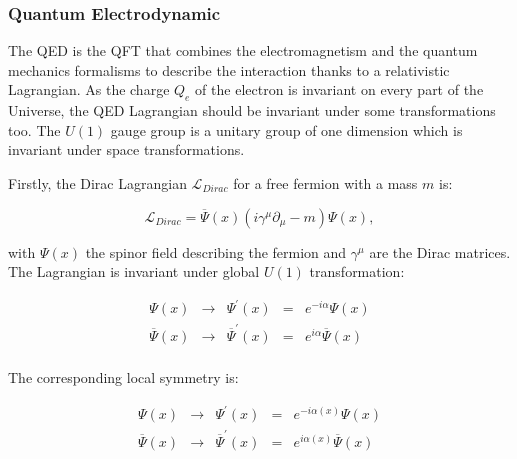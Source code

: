     
      \subsubsection{Quantum Electrodynamic}

     The \gls{QED} is the \gls{QFT} that combines the electromagnetism and the quantum mechanics formalisms to describe the interaction thanks to a relativistic Lagrangian.
     As the charge $Q_e$ of the electron is invariant on every part of the Universe, the \gls{QED} Lagrangian should be invariant under some transformations too.
     The $U(1)$ gauge group is a unitary group of one dimension which is invariant under space transformations.

      Firstly, the Dirac Lagrangian $\mathcal{L}_{Dirac}$ for a free fermion with a mass $m$ is:
      
      \begin{equation}
        \mathcal{L}_{Dirac} = \overline{\Psi}\left(x\right) \left(i \gamma^{\mu}\partial_{\mu} - m \right) \Psi\left(x\right),
        \label{eq:diracLag}
      \end{equation}

      with $\Psi\left(x\right)$ the spinor field describing the fermion and $\gamma^{\mu}$ are the Dirac matrices. 
      The Lagrangian is invariant under global $U(1)$ transformation:

      \begin{equation}
            \begin{array}{rrccr}
             \Psi \left(x \right) & \rightarrow & \Psi^{'} \left(x \right)  & = & e^{-i\alpha} \Psi\left(x\right) \\
             \overline{\Psi}\left(x\right) & \rightarrow & \overline{\Psi}^{'}\left(x\right) & = & e^{i\alpha}  \overline{\Psi}\left(x\right) \\
            \end{array}
      \end{equation}

      The corresponding local symmetry is:

      \begin{equation}
            \begin{array}{rcccr}
             \Psi\left(x\right) & \rightarrow & \Psi^{'} \left(x \right) & = & e^{-i\alpha(x)} \Psi\left(x\right) \\
             \overline{\Psi}\left(x\right) & \rightarrow & \overline{\Psi}^{'}\left(x\right) & = & e^{i\alpha(x)}  \overline{\Psi}\left(x\right) \\
            \end{array}
      \end{equation}

